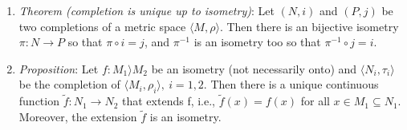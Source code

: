 \documentclass[10pt]{article}
\begin{document}
\begin{multicols*}{3}
\begin{enumerate}
		\item \emph{Theorem (completion is unique up to isometry)}: Let \((N,i)\) and \((P,j)\)
		      be two completions of a metric space \(\langle M,\rho\rangle\). Then there is
		      an bijective isometry \(\pi:N\to P\) so that \(\pi\circ i = j\), and
		      \(\pi^{-1}\) is an isometry too so that \(\pi^{-1}\circ j = i\).
		\item \emph{Proposition}: Let \(f:M_1 \rangle M_2\) be an isometry (not
			necessarily onto) and \(\langle N_i,\tau_i\rangle\) be the completion of
			\(\langle M_i,\rho_i\rangle,\ i=1,2\). Then there is a unique continuous
			function \(\widetilde{f}:N_1 \to N_2\) that extends f, i.e.,
			\(\widetilde{f}(x)=f(x)\) for all \(x\in M_1\subseteq N_1\). Moreover, the
			extension \(\widetilde{f}\) is an isometry.
	\end{enumerate}


\end{multicols*}
\end{document}
